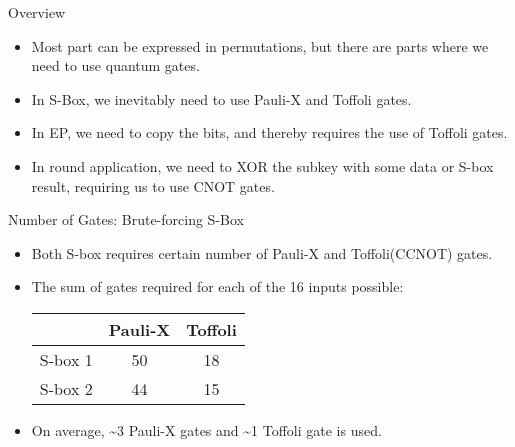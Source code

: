 \documentclass{beamer}
\begin{document}
	\begin{frame}{Overview}
		\begin{itemize}
			\item Most part can be expressed in permutations, but there are parts where we need to use quantum gates.
			\item In S-Box, we inevitably need to use Pauli-X and Toffoli gates.
			\item In EP, we need to copy the bits, and thereby requires the use of Toffoli gates.
			\item In round application, we need to XOR the subkey with some data or S-box result, requiring us to use CNOT gates.
		\end{itemize}
	\end{frame}
	
	\begin{frame}{Number of Gates: Brute-forcing S-Box}
		\begin{itemize}
			\item Both S-box requires certain number of Pauli-X and Toffoli(CCNOT) gates.
			\item The sum of gates required for each of the 16 inputs possible:
			\begin{center}
				\begin{tabular}{c|c|c}
					        & Pauli-X & Toffoli \\\hline
					S-box 1 & 50      & 18      \\\hline
					S-box 2 & 44      & 15
				\end{tabular}
			\end{center}
			\item On average, \textasciitilde3 Pauli-X gates and \textasciitilde1 Toffoli gate is used.
		\end{itemize}
	\end{frame}
	
\end{document}
